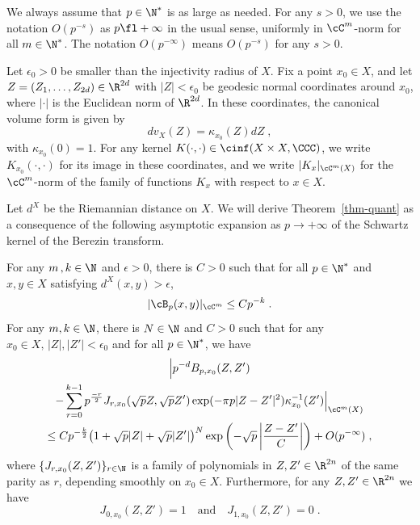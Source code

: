 We always assume that $p\in\N^*$ is as large as needed. For any $s>0$, we use the notation $O(p^{-s})$ as $p\fl+\infty$ in the usual sense, uniformly in $\cC^m$-norm for all $m\in\N^*$. The notation $O(p^{-\infty})$ means $O(p^{-s})$ for any $s>0$.

Let $\epsilon_0>0$ be smaller than the injectivity radius of $X$. Fix a point $x_0 \in X$, and let $Z=(Z_1,\dots,Z_{2d})\in\R^{2d}$ with $|Z|<\epsilon_0$ be geodesic normal coordinates around $x_0$, where $|\cdot|$ is the Euclidean norm of $\R^{2d}$. In these coordinates, the canonical volume form is given by
\begin{equation}\label{defkappa}
dv_X(Z)=\kappa_{x_0}(Z)dZ\;,
\end{equation}
with $\kappa_{x_0}(0)=1$. For any kernel $K(\cdot,\cdot)\in\cinf(X\times X,\CCC)$, we write $K_{x_0}(\cdot,\cdot)$ for its image in these coordinates, and we write $|K_x|_{\cC^m(X)}$ for the $\cC^m$-norm of the family of functions $K_x$ with respect to $x \in X$.

Let $d^X$ be the Riemannian distance on $X$. We will derive Theorem~\ref{thm-quant} as a consequence of the following asymptotic expansion as $p \to +\infty$ of the Schwartz kernel of the Berezin transform.

\begin{theo}\label{BTasy}
For any $m\,,k\in\N$ and $\epsilon>0$, there is $C>0$ such that for all $p\in\N^*$ and $x,y\in X$ satisfying $d^X(x,y)>\epsilon$,
\begin{equation}\label{thetafla}
|\cB_p(x,y)|_{\cC^m}\leq Cp^{-k}\;.
\end{equation}
For any $m, k\in\N$, there is $N\in\N$ and $C>0$ such that for any $x_0\in X,\,|Z|,|Z'|<\epsilon_0$ and for all $p\in\N^*$, we have
\begin{multline}\label{BTexp}
\Big|p^{-d} B_{p,x_0}(Z,Z')\\
-\sum_{r=0}^{k-1} p^{\frac{-r}{2}}J_{r,x_0}(\sqrt{p}Z,\sqrt{p}Z')
\exp(-\pi p|Z-Z'|^2)\kappa_{x_0}^{-1}(Z')\Big|_{\cC^m(X)}\\
\leq Cp^{-\frac{k}{2}}\big(1+\sqrt{p}|Z|+\sqrt{p}|Z'|\big)^N
\exp\left(-\sqrt{p}\left|\frac{Z-Z'}{C}\right|\right)+O(p^{-\infty})\;,
\end{multline}
where $\{J_{r,x_0}(Z,Z')\}_{r\in\N}$ is a family of polynomials in $Z,Z'\in\R^{2n}$ of the same parity as $r$, depending smoothly on $x_0\in X$. Furthermore, for any $Z,Z'\in\R^{2n}$ we have
\begin{equation}\label{|J|0}
J_{0,x_0}(Z,Z')=1\quad\text{and}\quad J_{1,x_0}(Z,Z')=0\;.
\end{equation}
\end{theo}

